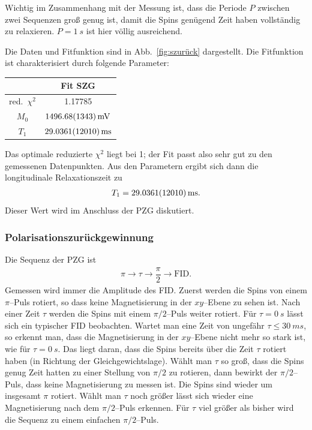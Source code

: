 \documentclass[10pt]{article}
\newenvironment{Figure}
  {\par\medskip\noindent\minipage{\linewidth}}
  {\endminipage\par\medskip}
\begin{document}
\begin{multicols}{2}
Wichtig im Zusammenhang mit der Messung ist, dass die Periode $P$ zwischen zwei Sequenzen groß genug ist, damit die Spins genügend Zeit haben vollständig zu relaxieren.
$P=\SI{1}{s}$ ist hier völlig ausreichend.
  \begin{Figure}
    \centering\resizebox{\textwidth}{!}{}
    \label{fig:szurück}
  \end{Figure}
Die Daten und Fitfunktion sind in Abb.\ \ref{fig:szurück} dargestellt.
Die Fitfunktion ist charakterisiert durch folgende Parameter:
  \begin{center}
    \begin{tabular}{c|c}
    & Fit SZG\\
    \hline
    red.\ $\chi^2$ & 1.17785\\
    $M_0$ & $\SI{1496.68+-13.43}{mV}$ \\
    $T_1$ & $\SI{29.0361+-1.201}{ms}$ 
    \end{tabular}
  \label{Tab:SZG_para}
  \end{center}
Das optimale reduzierte $\chi ^2$ liegt bei 1; der Fit passt also sehr gut zu den gemessenen Datenpunkten.
Aus den Parametern ergibt sich dann die longitudinale Relaxationszeit zu
\begin{align} 
        T_1=\SI{29.0361+-1.201}{ms}
.\end{align} 
Dieser Wert wird im Anschluss der PZG diskutiert.

\subsubsection{Polarisationszurückgewinnung}
Die Sequenz der PZG ist
\begin{align} 
        \pi \rightarrow \tau \rightarrow \dfrac{\pi }{2}\rightarrow \text{FID}
.\end{align} 
Gemessen wird immer die Amplitude des FID.
Zuerst werden die Spins von einem $\pi $--Puls rotiert, so dass keine Magnetisierung in der $xy$--Ebene zu sehen ist.
Nach einer Zeit $\tau $ werden die Spins mit einem $\pi /2$--Puls weiter rotiert.
Für $\tau =\SI{0}{s}$ lässt sich ein typischer FID beobachten.
Wartet man eine Zeit von ungefähr $\tau \leq \SI{30}{ms}$, so erkennt man, dass die Magnetisierung in der $xy$--Ebene nicht mehr so stark ist, wie für $\tau =\SI{0}{s}$.
Das liegt daran, dass die Spins bereits über die Zeit $\tau $ rotiert haben (in Richtung der Gleichgewichtslage).
Wählt man $\tau $ so groß, dass die Spins genug Zeit hatten zu einer Stellung von $\pi /2$ zu rotieren, dann bewirkt der $\pi /2$--Puls, dass keine Magnetisierung zu messen ist.
Die Spins sind wieder um insgesamt $\pi $ rotiert.
Wählt man $\tau $ noch größer lässt sich wieder eine Magnetisierung nach dem $\pi /2$--Puls erkennen.
Für $\tau $ viel größer als bisher wird die Sequenz zu einem einfachen $\pi /2$--Puls.


\end{multicols}
\end{document}
